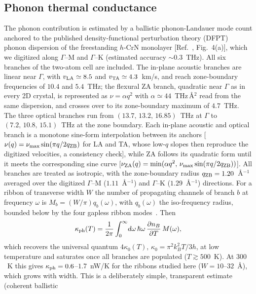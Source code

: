 \documentclass[preprint,12pt]{elsarticle}
\begin{document}
\subsection{Phonon thermal conductance}
\label{sec:phonons}
The phonon contribution is estimated by a ballistic phonon-Landauer mode count anchored to the
published density-functional perturbation theory (DFPT) phonon dispersion of the freestanding
$h$-CrN monolayer [Ref.~\cite{Modarresi2019}, Fig.~4(a)], which we digitized along $\Gamma$--M
and $\Gamma$--K (estimated accuracy $\sim$$0.3$~THz). All six branches of the two-atom cell are
included. The in-plane acoustic branches are linear near $\Gamma$, with
$v_{\rm LA}\simeq8.5$ and $v_{\rm TA}\simeq4.3$~km/s, and reach zone-boundary frequencies of
$10.4$ and $5.4$~THz; the flexural ZA branch, quadratic near $\Gamma$ as in every 2D
crystal, is represented as $\nu=\alpha q^2$ with $\alpha\simeq44$~THz\,\AA$^2$ read from the
same dispersion, and crosses over to its zone-boundary maximum of $4.7$~THz. The three optical
branches run from $(13.7,\,13.2,\,16.85)$~THz at $\Gamma$ to $(7.2,\,10.8,\,15.1)$~THz at the
zone boundary. Each in-plane acoustic and optical branch is a monotone sine-form
interpolation between its anchors [$\nu(q)=\nu_{\rm max}\sin(\pi q/2q_{\rm ZB})$ for LA and
TA, whose low-$q$ slopes then reproduce the digitized velocities, a consistency check],
while ZA follows its quadratic form until it meets the corresponding sine curve
[$\nu_{\rm ZA}(q)=\min(\alpha q^2,\,\nu_{\rm max}\sin(\pi q/2q_{\rm ZB}))$]. All branches are
treated as isotropic,
with the zone-boundary radius $q_{\rm ZB}=1.20$~\AA$^{-1}$ averaged over the digitized
$\Gamma$--M ($1.11$~\AA$^{-1}$) and $\Gamma$--K ($1.29$~\AA$^{-1}$) directions. For a ribbon
of transverse width $W$ the number of propagating channels of branch $b$ at frequency $\omega$
is $M_b=(W/\pi)q_b(\omega)$, with $q_b(\omega)$ the iso-frequency radius, bounded below by the
four gapless ribbon modes~\cite{Rego1998}. Then
\begin{equation}
\kappa_{\rm ph}(T)=\frac{1}{2\pi}\int_0^\infty\! d\omega\,\hbar\omega\,
\frac{\partial n_B}{\partial T}\,M(\omega),
\label{eq:kph}
\end{equation}
which recovers the universal quantum $4\kappa_0(T)$, $\kappa_0=\pi^2k_B^2T/3h$, at low
temperature and saturates once all branches are populated ($T\gtrsim500$~K). At $300$~K this
gives $\kappa_{\rm ph}=0.6$--$1.7$~nW/K for the ribbons studied here ($W=10$--$32$~\AA),
which grows with width. This is a deliberately simple, transparent estimate (coherent ballistic
$$
\end{document}
